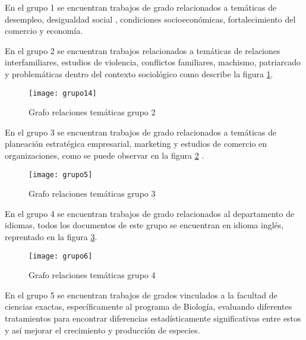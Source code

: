 En el grupo 1 se encuentran trabajos de grado relacionados a temáticas de desempleo, desigualdad social , condiciones socioeconómicas, fortalecimiento del comercio y economía. 

En el grupo 2 se encuentran trabajos relacionados a temáticas de relaciones interfamiliares, estudios de violencia, conflictos familiares, machismo, patriarcado y problemáticas dentro del contexto sociológico como describe la figura \ref{fig:grupo14}.
\begin{figure}[H]\centering
\texttt{[image: grupo14]}
\caption{Grafo  relaciones temáticas grupo 2 }
\label{fig:grupo14}
\end{figure}



En el grupo 3 se encuentran trabajos de grado relacionados a temáticas de planeación estratégica empresarial, marketing y estudios de comercio en  organizaciones, como se puede observar en la figura \ref{fig:grupo5} .
\begin{figure}[H]\centering
\texttt{[image: grupo5]}
\caption{Grafo relaciones temáticas grupo 3 }
\label{fig:grupo5}
\end{figure}

En el grupo 4 se encuentran trabajos de grado relacionados al departamento de idiomas, todos los documentos de este grupo se encuentran en idioma inglés, reprentado en la figura \ref{fig:grupo6}.

\begin{figure}[H]\centering
\texttt{[image: grupo6]}
\caption{Grafo  relaciones temáticas grupo 4 }
\label{fig:grupo6}
\end{figure}

En el grupo 5 se encuentran trabajos de grados vinculados a la facultad de ciencias exactas, específicamente al programa de Biología, evaluando diferentes tratamientos para encontrar diferencias estadísticamente significativas entre estos y así mejorar el crecimiento y producción de especies. %

